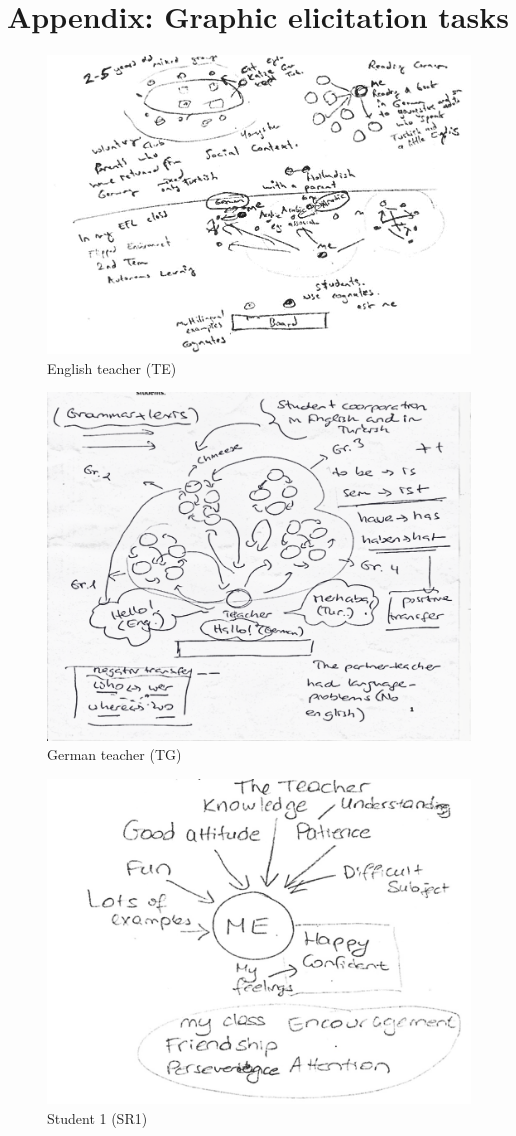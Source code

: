 \documentclass[output=paper]{../langscibook}
\begin{document}
\section*{Appendix: Graphic elicitation tasks}

\begin{figure}
\includegraphics[width=.75\textwidth]{figures/a4-img001.png}
\caption{English teacher (TE)\label{fig:4:1}}
\end{figure}

\begin{figure}
\caption{German teacher (TG)\label{fig:4:2}}
\includegraphics[width=.75\textwidth]{figures/a4-img002.png}
\end{figure}
  
\begin{figure}
\caption{Student 1 (SR1)\label{fig:4:3}}
\includegraphics[width=.75\textwidth]{figures/a4-img003.png}
\end{figure}
\end{document}
